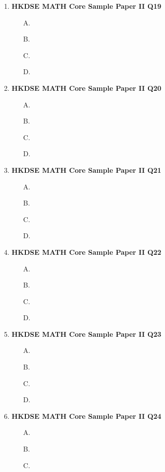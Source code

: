 \documentclass[12pt]{article}
\begin{document}
\begin{enumerate}
	\item \textbf{HKDSE MATH Core Sample Paper II Q19}\\
	\begin{enumerate}
		\item[A.]
		\item[B.]
		\item[C.]
		\item[D.]
	\end{enumerate}
	\item \textbf{HKDSE MATH Core Sample Paper II Q20}\\
	\begin{enumerate}
		\item[A.]
		\item[B.]
		\item[C.]
		\item[D.]
	\end{enumerate}
	\item \textbf{HKDSE MATH Core Sample Paper II Q21}\\
	\begin{enumerate}
		\item[A.]
		\item[B.]
		\item[C.]
		\item[D.]
	\end{enumerate}
	\item \textbf{HKDSE MATH Core Sample Paper II Q22}\\
	\begin{enumerate}
		\item[A.]
		\item[B.]
		\item[C.]
		\item[D.]
	\end{enumerate}
	\item \textbf{HKDSE MATH Core Sample Paper II Q23}\\
	\begin{enumerate}
		\item[A.]
		\item[B.]
		\item[C.]
		\item[D.]
	\end{enumerate}
	\item \textbf{HKDSE MATH Core Sample Paper II Q24}\\
	\begin{enumerate}
		\item[A.]
		\item[B.]
		\item[C.]

\end{enumerate}
\end{enumerate}
\end{document}
